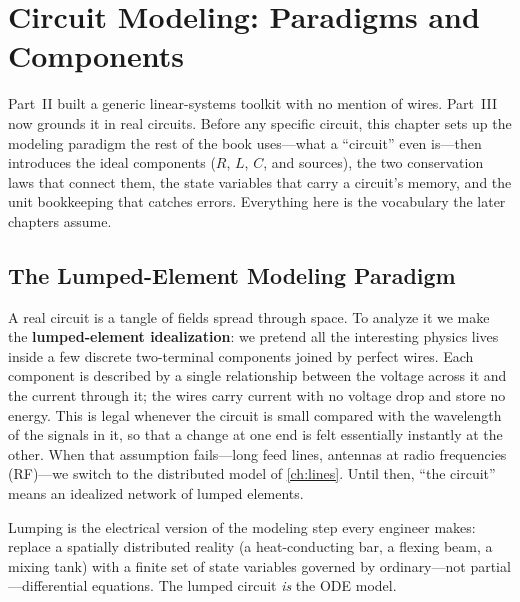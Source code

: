 \chapter{Circuit Modeling: Paradigms and Components}
\label{ch:foundations}
Part~II built a generic linear-systems toolkit with no mention of wires. Part~III
now grounds it in real circuits. Before any specific circuit, this chapter sets up
the modeling paradigm the rest of the book uses---what a ``circuit'' even
is---then introduces the ideal components (\(R\), \(L\), \(C\), and sources), the
two conservation laws that connect them, the state variables that carry a
circuit's memory, and the unit bookkeeping that catches errors. Everything here is
the vocabulary the later chapters assume.

\section{The Lumped-Element Modeling Paradigm}
A real circuit is a tangle of fields spread through space. To analyze it we make
the \textbf{lumped-element idealization}: we pretend all the interesting physics
lives inside a few discrete two-terminal components joined by perfect wires. Each
component is described by a single relationship between the voltage across it and
the current through it; the wires carry current with no voltage drop and store no
energy. This is legal whenever the circuit is small compared with the wavelength of
the signals in it, so that a change at one end is felt essentially instantly at the
other. When that assumption fails---long feed lines, antennas at radio
frequencies (RF)---we switch to
the distributed model of \cref{ch:lines}. Until then, ``the circuit'' means an
idealized network of lumped elements.

\begin{controlsbox}
Lumping is the electrical version of the modeling step every engineer makes:
replace a spatially distributed reality (a heat-conducting bar, a flexing beam,
a mixing tank) with a finite set of state variables governed by ordinary---not
partial---differential equations. The lumped circuit \emph{is} the ODE model.
\end{controlsbox}

